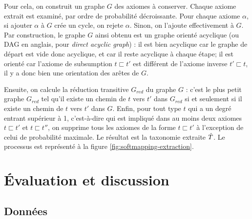 Pour cela, on construit un graphe $G$ des axiomes à conserver. Chaque axiome extrait est examiné, par ordre de probabilité décroissante. Pour chaque axiome $\alpha$, si ajouter $\alpha$ à $G$ crée un cycle, on rejete $\alpha$. Sinon, on l'ajoute effectivement à $G$. Par construction, le graphe $G$ ainsi obtenu est un graphe orienté acyclique (ou DAG en anglais, pour \textit{direct acyclic graph}) : il est bien acyclique car le graphe de départ est vide donc acyclique, et car il reste acyclique à chaque étape; il est orienté car l'axiome de subsumption $t \sqsubset t'$ est différent de l'axiome inverse $t' \sqsubset t$, il y a donc bien une orientation des arêtes de $G$. 

Ensuite, on calcule la réduction transitive $G_{red}$ du graphe $G$ : c'est le plus petit graphe $G_{red}$ tel qu'il existe un chemin de $t$ vers $t'$ dans $G_{red}$ si et seulement si il existe un chemin de $t$ vers $t'$ dans $G$. Enfin, pour tout type $t$ qui a un degré entrant supérieur à 1, c'est-à-dire qui est impliqué dans au moins deux axiomes $t \sqsubset t'$ et $t\sqsubset t''$, on supprime tous les axiomes de la forme $t \sqsubset t'$ à l'exception de celui de probabilité maximale. Le résultat est la taxonomie extraite $\hat{T}$. Le processus est représenté à la figure \ref{fig:softmapping-extraction}.


\section{Évaluation et discussion}
\label{sec:te-evaluation}

\subsection{Données}
\label{sec:te-data}

